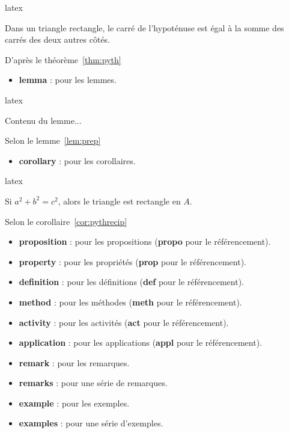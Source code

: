 \documentclass[
    french,
    margin=2cm
]{neoschool}
\begin{document}
\begin{code}{latex}
\begin{theorem}[title=Théorème de Pythagore,label=pyth]
    Dans un triangle rectangle, le carré de
    l'hypoténuse est égal à la somme des carrés
    des deux autres côtés.
\end{theorem}

D'après le théorème~\ref{thm:pyth}
\end{code}

\begin{itemize}
\item
  \textbf{lemma} : pour les lemmes.
\end{itemize}

\begin{code}{latex}
\begin{lemma}[title=Lemme préparatoire,label=prep]
    Contenu du lemme...
\end{lemma}

Selon le lemme~\ref{lem:prep}
\end{code}

\begin{itemize}
\item
  \textbf{corollary} : pour les corollaires.
\end{itemize}

\begin{code}{latex}
\begin{corollary}[
    title=Réciproque de Pythagore,
    label=pythrecip
]
    Si $a^2 + b^2 = c^2$, alors le triangle est
    rectangle en $A$.
\end{corollary}

Selon le corollaire~\ref{cor:pythrecip}
\end{code}

\begin{itemize}
\item \textbf{proposition} : pour les propositions (\textbf{propo} pour le
  référencement).
\item \textbf{property} : pour les propriétés (\textbf{prop} pour le
  référencement).
\item \textbf{definition} : pour les définitions (\textbf{def} pour le
  référencement).
\item \textbf{method} : pour les méthodes (\textbf{meth} pour le
  référencement).
\item \textbf{activity} : pour les activités (\textbf{act} pour le
  référencement).
\item \textbf{application} : pour les applications (\textbf{appl} pour le
  référencement).
\item \textbf{remark} : pour les remarques.
\item \textbf{remarks} : pour une série de remarques.
\item \textbf{example} : pour les exemples.
\item \textbf{examples} : pour une série d'exemples.
\end{itemize}
\end{document}
